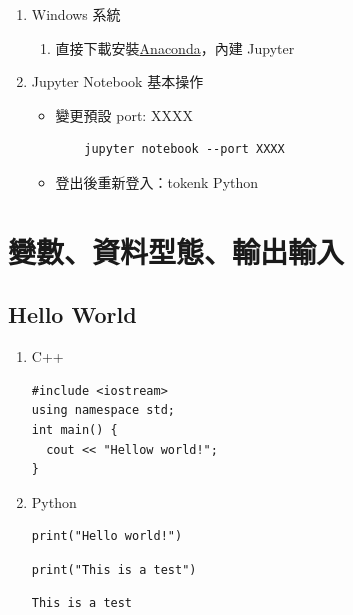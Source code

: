 \documentclass[a4paper,12pt]{article}
\begin{document}
\begin{enumerate}
\begin{enumerate}
\begin{itemize}
\lstset{breaklines=true,language=shell,label= ,caption= ,captionpos=b,numbers=none}
\begin{lstlisting}
    jupyter notebook
\end{lstlisting}
\item 預設網址: \url{http://localhost:8888}\\
\end{itemize}
\end{enumerate}
\item Windows 系統
\label{sec:org01a748e}
\begin{enumerate}
\item 直接下載安裝\href{https://www.anaconda.com/download}{Anaconda}，內建 Jupyter
\label{sec:org9b3a2e1}
\end{enumerate}
\item Jupyter Notebook 基本操作
\label{sec:org73a898b}
\begin{itemize}
\item 變更預設 port: XXXX\\
\lstset{breaklines=true,language=shell,label= ,caption= ,captionpos=b,numbers=none}
\begin{lstlisting}
    jupyter notebook --port XXXX
\end{lstlisting}
\item 登出後重新登入：tokenk Python\\
\end{itemize}

\newpage
\end{enumerate}

\section{變數、資料型態、輸出輸入}
\label{py-variables}
\subsection{Hello World}
\label{sec:orgfdceb82}
\begin{enumerate}
\item C++
\label{sec:org93d1310}
\lstset{breaklines=true,language=cpp,label= ,caption= ,captionpos=b,firstnumber=1,numbers=left}
\begin{lstlisting}
#include <iostream>
using namespace std;
int main() {
  cout << "Hellow world!";
}
\end{lstlisting}
\item Python
\label{sec:org2d1c067}
\lstset{breaklines=true,language=Python,label= ,caption= ,captionpos=b,firstnumber=1,numbers=left}
\begin{lstlisting}
print("Hello world!")
\end{lstlisting}

\lstset{breaklines=true,language=Python,label= ,caption= ,captionpos=b,firstnumber=1,numbers=left}
\begin{lstlisting}
print("This is a test")
\end{lstlisting}

\begin{verbatim}
This is a test
\end{verbatim}
\end{enumerate}
\end{document}
